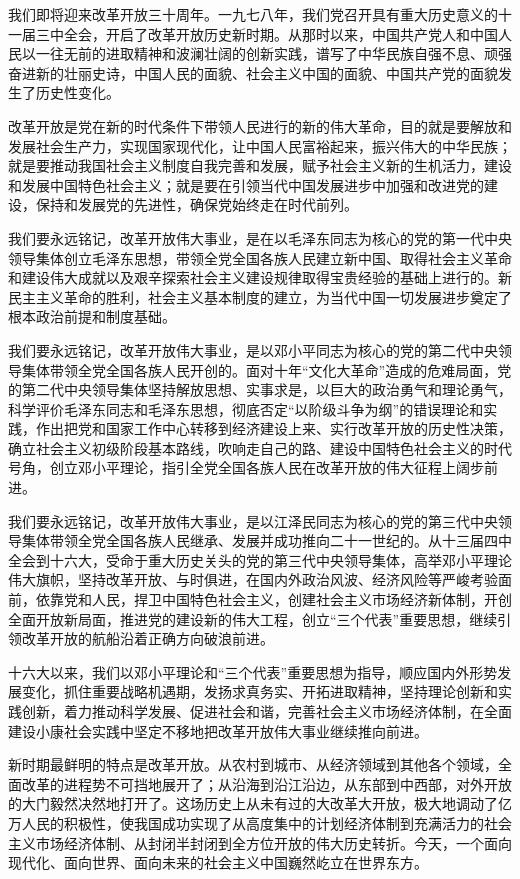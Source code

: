 我们即将迎来改革开放三十周年。一九七八年，我们党召开具有重大历史意义的十一届三中全会，开启了改革开放历史新时期。从那时以来，中国共产党人和中国人民以一往无前的进取精神和波澜壮阔的创新实践，谱写了中华民族自强不息、顽强奋进新的壮丽史诗，中国人民的面貌、社会主义中国的面貌、中国共产党的面貌发生了历史性变化。

改革开放是党在新的时代条件下带领人民进行的新的伟大革命，目的就是要解放和发展社会生产力，实现国家现代化，让中国人民富裕起来，振兴伟大的中华民族；就是要推动我国社会主义制度自我完善和发展，赋予社会主义新的生机活力，建设和发展中国特色社会主义；就是要在引领当代中国发展进步中加强和改进党的建设，保持和发展党的先进性，确保党始终走在时代前列。

我们要永远铭记，改革开放伟大事业，是在以毛泽东同志为核心的党的第一代中央领导集体创立毛泽东思想，带领全党全国各族人民建立新中国、取得社会主义革命和建设伟大成就以及艰辛探索社会主义建设规律取得宝贵经验的基础上进行的。新民主主义革命的胜利，社会主义基本制度的建立，为当代中国一切发展进步奠定了根本政治前提和制度基础。

我们要永远铭记，改革开放伟大事业，是以邓小平同志为核心的党的第二代中央领导集体带领全党全国各族人民开创的。面对十年“文化大革命”造成的危难局面，党的第二代中央领导集体坚持解放思想、实事求是，以巨大的政治勇气和理论勇气，科学评价毛泽东同志和毛泽东思想，彻底否定“以阶级斗争为纲”的错误理论和实践，作出把党和国家工作中心转移到经济建设上来、实行改革开放的历史性决策，确立社会主义初级阶段基本路线，吹响走自己的路、建设中国特色社会主义的时代号角，创立邓小平理论，指引全党全国各族人民在改革开放的伟大征程上阔步前进。

我们要永远铭记，改革开放伟大事业，是以江泽民同志为核心的党的第三代中央领导集体带领全党全国各族人民继承、发展并成功推向二十一世纪的。从十三届四中全会到十六大，受命于重大历史关头的党的第三代中央领导集体，高举邓小平理论伟大旗帜，坚持改革开放、与时俱进，在国内外政治风波、经济风险等严峻考验面前，依靠党和人民，捍卫中国特色社会主义，创建社会主义市场经济新体制，开创全面开放新局面，推进党的建设新的伟大工程，创立“三个代表”重要思想，继续引领改革开放的航船沿着正确方向破浪前进。

十六大以来，我们以邓小平理论和“三个代表”重要思想为指导，顺应国内外形势发展变化，抓住重要战略机遇期，发扬求真务实、开拓进取精神，坚持理论创新和实践创新，着力推动科学发展、促进社会和谐，完善社会主义市场经济体制，在全面建设小康社会实践中坚定不移地把改革开放伟大事业继续推向前进。

新时期最鲜明的特点是改革开放。从农村到城市、从经济领域到其他各个领域，全面改革的进程势不可挡地展开了；从沿海到沿江沿边，从东部到中西部，对外开放的大门毅然决然地打开了。这场历史上从未有过的大改革大开放，极大地调动了亿万人民的积极性，使我国成功实现了从高度集中的计划经济体制到充满活力的社会主义市场经济体制、从封闭半封闭到全方位开放的伟大历史转折。今天，一个面向现代化、面向世界、面向未来的社会主义中国巍然屹立在世界东方。

